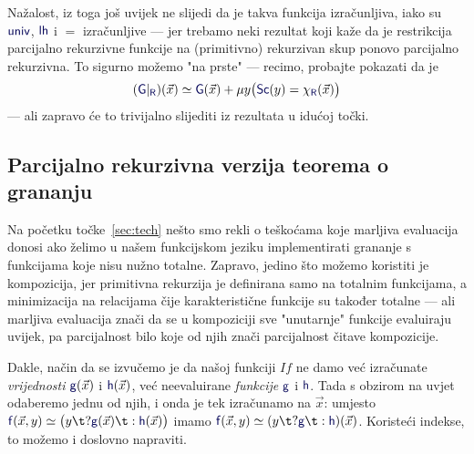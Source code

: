 \begin{napomena}[{name=[restrikcija na izračunljiv skup čuva izračunljivost]}]\label{nap:restrprek}
Nažalost, iz toga još uvijek ne slijedi da je takva funkcija izračunljiva, iako su $\f{univ}$, $\f{lh}$ i $=$ izračunljive --- jer trebamo neki rezultat koji kaže da je restrikcija parcijalno rekurzivne funkcije na (primitivno) rekurzivan skup ponovo parcijalno rekurzivna. To sigurno možemo "na prste" --- recimo, probajte pokazati da je
    \begin{equation}\label{eq:restrprek}
        (\f G|_{\f R})(\vec x)\simeq\f G(\vec x)+\mu y\bigl(\f{Sc}(y)\eq\chi_{\f R}(\vec x)\bigr)
\end{equation}
--- ali zapravo će to trivijalno slijediti iz rezultata u idućoj točki. %
\end{napomena}

\subsection{Parcijalno rekurzivna verzija teorema o grananju}

Na početku točke~\ref{sec:tech} nešto smo rekli o teškoćama koje marljiva evaluacija donosi ako želimo u našem funkcijskom jeziku implementirati grananje s funkcijama koje nisu nužno totalne. Zapravo, jedino što možemo koristiti je kompozicija, jer primitivna rekurzija je definirana samo na totalnim funkcijama, a minimizacija na relacijama čije karakteristične funkcije su također totalne --- ali marljiva evaluacija znači da se u kompoziciji sve "unutarnje" funkcije evaluiraju uvijek, pa parcijalnost bilo koje od njih znači parcijalnost čitave kompozicije.

Dakle, način da se izvučemo je da našoj funkciji $If$ ne damo već izračunate \emph{vrijednosti} $\f g(\vec x)$ i $\f h(\vec x)$, već neevaluirane \emph{funkcije} $\f g$ i $\f h$. Tada s obzirom na uvjet odaberemo jednu od njih, i onda je tek izračunamo na $\vec x$: umjesto $\f f(\vec x,y)\simeq \bigl(y\t?\f g(\vec x)\t:\f h(\vec x)\bigr)$ imamo $\f f(\vec x,y)\simeq (y\t?\f g\t:\f h)(\vec x)$. Koristeći indekse, to možemo i doslovno napraviti.

